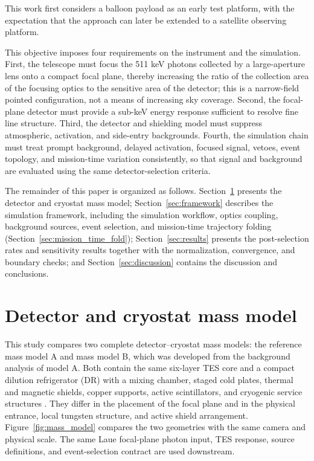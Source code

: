 \documentclass[11pt]{article}
\begin{document}
This work first considers a balloon payload as an early test platform, with the
expectation that the approach can later be extended to a satellite observing
platform.

This objective imposes four requirements on the instrument and the simulation.
First, the telescope must focus the 511 keV photons collected by a large-aperture
lens onto a compact focal plane, thereby increasing the ratio of the collection
area of the focusing optics to the sensitive area of the detector; this is a
narrow-field pointed configuration, not a means of increasing sky coverage.
Second, the focal-plane detector must provide a sub-keV energy response
sufficient to resolve fine line structure. Third, the detector and shielding
model must suppress atmospheric, activation, and side-entry backgrounds.
Fourth, the simulation chain must treat prompt background, delayed activation,
focused signal, vetoes, event topology, and mission-time variation consistently,
so that signal and background are evaluated using the same detector-selection
criteria.

The remainder of this paper is organized as follows. Section~\ref{sec:geometry}
presents the detector and cryostat mass model; Section~\ref{sec:framework}
describes the simulation framework, including the simulation workflow, optics
coupling, background sources, event selection, and mission-time trajectory
folding (Section~\ref{sec:mission_time_fold}); Section~\ref{sec:results} presents
the post-selection rates and sensitivity results together with the
normalization, convergence, and boundary checks; and
Section~\ref{sec:discussion} contains the discussion and conclusions.

\endgroup

\section{Detector and cryostat mass model}
\label{sec:geometry}

This study compares two complete detector--cryostat mass models: the reference
mass model A and mass model B, which was developed from the background analysis
of model A. Both contain the same six-layer TES core and a compact dilution
refrigerator (DR) with a mixing chamber, staged cold plates, thermal and magnetic
shields, copper supports, active scintillators, and cryogenic service structures
\cite{Shirazi2023,Gottardi2021TESReview}. They differ in the placement of the
focal plane and in the physical entrance, local tungsten structure, and active
shield arrangement. Figure~\ref{fig:mass_model} compares the two geometries with
the same camera and physical scale. The same Laue focal-plane photon input, TES
response, source definitions, and event-selection contract are used downstream.
\end{document}
